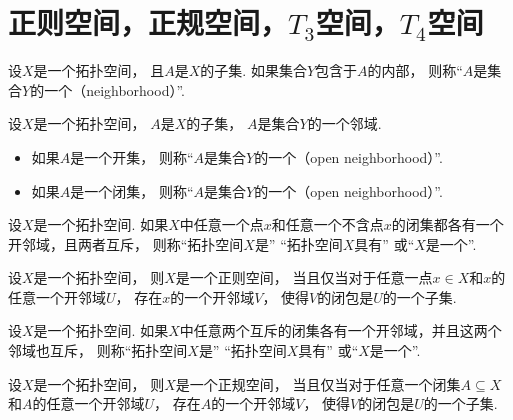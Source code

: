 \section{正则空间，正规空间，\texorpdfstring{\(T_3\)}{T3}空间，\texorpdfstring{\(T_4\)}{T4}空间}
\begin{definition}
设\(X\)是一个拓扑空间，
且\(A\)是\(X\)的子集.
如果集合\(Y\)包含于\(A\)的内部，
则称“\(A\)是集合\(Y\)的一个（neighborhood）”.
\end{definition}
\begin{definition}
设\(X\)是一个拓扑空间，
\(A\)是\(X\)的子集，
\(A\)是集合\(Y\)的一个邻域.
\begin{itemize}
	\item 如果\(A\)是一个开集，
	则称“\(A\)是集合\(Y\)的一个（open neighborhood）”.
	\item 如果\(A\)是一个闭集，
	则称“\(A\)是集合\(Y\)的一个（open neighborhood）”.
\end{itemize}
\end{definition}

\begin{definition}
设\(X\)是一个拓扑空间.
如果\(X\)中任意一个点\(x\)和任意一个不含点\(x\)的闭集都各有一个开邻域，且两者互斥，
则称“拓扑空间\(X\)是”
“拓扑空间\(X\)具有”
或“\(X\)是一个”.
\end{definition}

\begin{theorem}
设\(X\)是一个拓扑空间，
则\(X\)是一个正则空间，
当且仅当对于任意一点\(x \in X\)和\(x\)的任意一个开邻域\(U\)，
存在\(x\)的一个开邻域\(V\)，
使得\(V\)的闭包是\(U\)的一个子集.
\end{theorem}

\begin{definition}
设\(X\)是一个拓扑空间.
如果\(X\)中任意两个互斥的闭集各有一个开邻域，并且这两个邻域也互斥，
则称“拓扑空间\(X\)是”
“拓扑空间\(X\)具有”
或“\(X\)是一个”.
\end{definition}

\begin{theorem}
设\(X\)是一个拓扑空间，
则\(X\)是一个正规空间，
当且仅当对于任意一个闭集\(A \subseteq X\)和\(A\)的任意一个开邻域\(U\)，
存在\(A\)的一个开邻域\(V\)，
使得\(V\)的闭包是\(U\)的一个子集.
\end{theorem}

